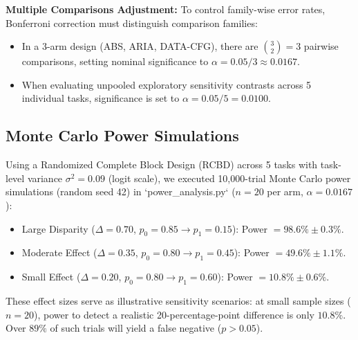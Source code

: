 \documentclass[11pt,a4paper]{article}
\begin{document}
\textbf{Multiple Comparisons Adjustment:} To control family-wise error rates, Bonferroni correction must distinguish comparison families:
\begin{itemize}
    \item In a 3-arm design (ABS, ARIA, DATA-CFG), there are $\binom{3}{2} = 3$ pairwise comparisons, setting nominal significance to $\alpha = 0.05 / 3 \approx 0.0167$.
    \item When evaluating unpooled exploratory sensitivity contrasts across 5 individual tasks, significance is set to $\alpha = 0.05 / 5 = 0.0100$.
\end{itemize}

\subsection{Monte Carlo Power Simulations}
Using a Randomized Complete Block Design (RCBD) across 5 tasks with task-level variance $\sigma^2 = 0.09$ (logit scale), we executed 10,000-trial Monte Carlo power simulations (random seed 42) in `power\_analysis.py` ($n=20$ per arm, $\alpha = 0.0167$):
\begin{itemize}
    \item Large Disparity ($\Delta = 0.70$, $p_0=0.85 \to p_1=0.15$): Power $= 98.6\% \pm 0.3\%$.
    \item Moderate Effect ($\Delta = 0.35$, $p_0=0.80 \to p_1=0.45$): Power $= 49.6\% \pm 1.1\%$.
    \item Small Effect ($\Delta = 0.20$, $p_0=0.80 \to p_1=0.60$): Power $= \mathbf{10.8\% \pm 0.6\%}$.
\end{itemize}
These effect sizes serve as illustrative sensitivity scenarios: at small sample sizes ($n=20$), power to detect a realistic 20-percentage-point difference is only $10.8\%$. Over $89\%$ of such trials will yield a false negative ($p > 0.05$).
\end{document}
